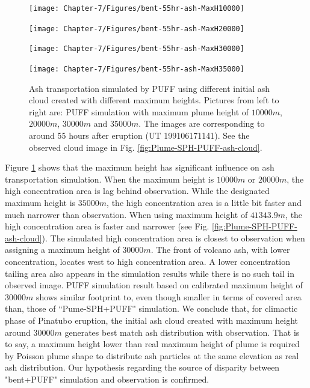 \begin{figure}[!htb]
    \centering
    \begin{minipage}{.245\textwidth}
        \centering
        \texttt{[image: Chapter-7/Figures/bent-55hr-ash-MaxH10000]}
    \end{minipage}%
    \begin{minipage}{.245 \textwidth}
        \centering
        \texttt{[image: Chapter-7/Figures/bent-55hr-ash-MaxH20000]}
    \end{minipage}%
    \begin{minipage}{.245 \textwidth}
        \centering
        \texttt{[image: Chapter-7/Figures/bent-55hr-ash-MaxH30000]}
    \end{minipage}%
    \begin{minipage}{.245 \textwidth}
        \centering
        \texttt{[image: Chapter-7/Figures/bent-55hr-ash-MaxH35000]}
    \end{minipage}%
    \caption{Ash transportation simulated by PUFF using different initial ash cloud created with different maximum heights. Pictures from left to right are: PUFF simulation with maximum plume height of $10000 m$, $20000 m$, $30000 m$ and $35000 m$. The images are corresponding to around 55 hours after eruption (UT 199106171141).  See the observed cloud image in Fig. \ref{fig:Plume-SPH-PUFF-ash-cloud}. }
    \label{fig:Various-Maximum-height-Pinatubo-ash-cloud}
\end{figure}

Figure \ref{fig:Various-Maximum-height-Pinatubo-ash-cloud} shows that the maximum height has significant influence on ash transportation simulation. When the maximum height is $10000 m$ or $20000 m$, the high concentration area is lag behind observation. While the designated maximum height is $35000 m$, the high concentration area is a little bit faster and much narrower than observation. When using maximum height of $41343.9 m$, the high concentration area is faster and narrower (see Fig. \ref{fig:Plume-SPH-PUFF-ash-cloud}). The simulated high concentration area is closest to observation when assigning a maximum height of $30000 m$. The front of volcano ash, with lower concentration, locates west to high concentration area. A lower concentration tailing area also appears in the simulation results while there is no such tail in observed image. PUFF simulation result based on calibrated maximum height of $30000 m$ shows similar footprint to, even though smaller in terms of covered area than, those of ``Pume-SPH+PUFF" simulation. We conclude that, for climactic phase of Pinatubo eruption, the initial ash cloud created with maximum height around  $30000 m$ generates best match ash distribution with observation. That is to say, a maximum height lower than real maximum height of plume is required by Poisson plume shape to distribute ash particles at the same elevation as real ash distribution. Our hypothesis regarding the source of disparity between "bent+PUFF" simulation and observation is confirmed.

